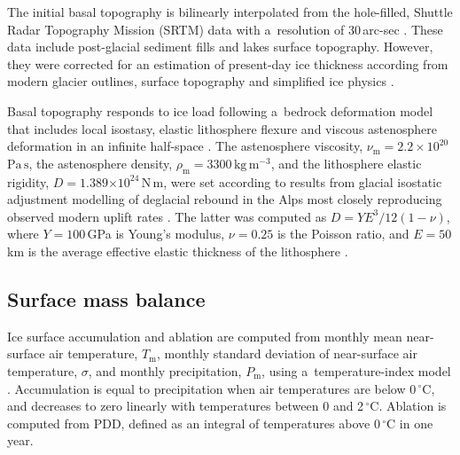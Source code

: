 \documentclass{article}
\newcommand{\e}[1]{\ensuremath{\times 10^{#1}}}
\newcommand{\unit}[1]{\ensuremath{\mathrm{#1}}}
\newcommand{\degree}[0]{\ensuremath{^{\circ}}}
\begin{document}
    The initial basal topography is bilinearly interpolated from the
    hole-filled, Shuttle Radar Topography Mission (SRTM) data with a~resolution
    of 30\,arc-sec \citep{Jarvis.etal.2008}. These data include post-glacial
    sediment fills and lakes surface topography. However, they were corrected
    for an estimation of present-day ice thickness according from modern
    glacier outlines, surface topography and simplified ice physics
    \citep{Huss.Farinotti.2012}.

    Basal topography responds to ice load following a~bedrock deformation model
    that includes local isostasy, elastic lithosphere flexure and viscous
    astenosphere deformation in an infinite half-space
    \citep{Lingle.Clark.1985,Bueler.etal.2007}. The astenosphere viscosity,
    $\nu_{\mathrm{m}}=2.2\times10^{20}$\,\unit{Pa\,s}, the astenosphere
    density, $\rho_{\mathrm{m}}=3300$\,\unit{kg\,m^{-3}}, and the lithosphere
    elastic rigidity, $D=1.389\e{24}$\,\unit{N\,m}, were set according to
    results from glacial isostatic adjustment modelling of deglacial rebound in
    the Alps most closely reproducing observed modern uplift rates
    \citep[Table~\ref{tab:params};][Supplementary Fig.~7]{Mey.etal.2016}. The
    latter was computed as $D=YE^3/12(1-\nu)$, where $Y=100$\,GPa is Young's
    modulus, $\nu=0.25$ is the Poisson ratio, and $E=50$\,km is the average
    effective elastic thickness of the lithosphere
    \citep[Table~\ref{tab:params};][]{Mey.etal.2016}.

\subsection{Surface mass balance}
\label{sec:surface}

      Ice surface accumulation and ablation are computed from monthly mean
      near-surface air temperature, $T_{\mathrm{m}}$, monthly standard
      deviation of near-surface air temperature, $\sigma$, and monthly
      precipitation, $P_{\mathrm{m}}$, using a~temperature-index model
      \citep[e.g.,][]{Hock.2003}. Accumulation is equal to precipitation
      when air temperatures are below 0\,\unit{{\degree}C}, and decreases to
      zero linearly with temperatures between 0 and 2\,\unit{{\degree}C}.
      Ablation is computed from PDD, defined as an integral of temperatures
      above 0\,\unit{{\degree}C} in one year.
\end{document}
